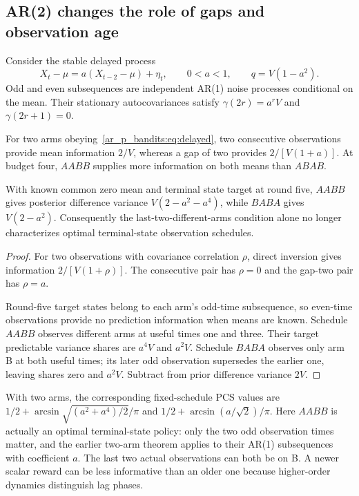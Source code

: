 \subsection{AR(2) changes the role of gaps and observation age}
Consider the stable delayed process
\begin{equation}
X_t-\mu=a(X_{t-2}-\mu)+\eta_t,\qquad 0<a<1,
\qquad q=V(1-a^2).
\label{ar_p_bandits:eq:delayed}
\end{equation}
Odd and even subsequences are independent AR(1) noise processes conditional on the mean. Their stationary autocovariances satisfy
$\gamma(2r)=a^rV$ and $\gamma(2r+1)=0$.

\begin{proposition}
For two arms obeying~\eqref{ar_p_bandits:eq:delayed}, two consecutive observations provide mean information $2/V$, whereas a gap of two provides $2/[V(1+a)]$. At budget four, $AABB$ supplies more information on both means than $ABAB$.

With known common zero mean and terminal state target at round five, $AABB$ gives posterior difference variance $V(2-a^2-a^4)$, while $BABA$ gives $V(2-a^2)$. Consequently the last-two-different-arms condition alone no longer characterizes optimal terminal-state observation schedules.
\end{proposition}
\begin{proof}
For two observations with covariance correlation $\rho$, direct inversion gives information $2/[V(1+\rho)]$. The consecutive pair has $\rho=0$ and the gap-two pair has $\rho=a$.

Round-five target states belong to each arm's odd-time subsequence, so even-time observations provide no prediction information when means are known. Schedule $AABB$ observes different arms at useful times one and three. Their target predictable variance shares are $a^4V$ and $a^2V$. Schedule $BABA$ observes only arm B at both useful times; its later odd observation supersedes the earlier one, leaving shares zero and $a^2V$. Subtract from prior difference variance $2V$.
\end{proof}
With two arms, the corresponding fixed-schedule PCS values are $1/2+\arcsin\sqrt{(a^2+a^4)/2}/\pi$ and $1/2+\arcsin(a/\sqrt2)/\pi$. Here $AABB$ is actually an optimal terminal-state policy: only the two odd observation times matter, and the earlier two-arm theorem applies to their AR(1) subsequences with coefficient $a$. The last two actual observations can both be on B. A newer scalar reward can be less informative than an older one because higher-order dynamics distinguish lag phases.

